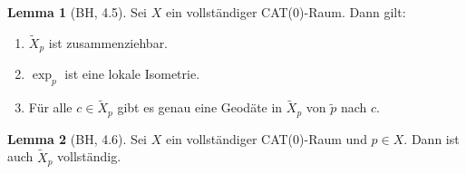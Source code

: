 \documentclass{beamer}
\theoremstyle{definition}
\newtheorem*{lem}{Lemma}
\begin{document}
\begin{frame}
  \begin{lem}[BH, 4.5]
    Sei $X$ ein vollständiger CAT($0$)-Raum. Dann gilt:
    \begin{enumerate}
      \item $\tilde{X}_p$ ist zusammenziehbar.
      \item $\exp_p$ ist eine lokale Isometrie. %
      \item Für alle $c {\in} \tilde{X}_p$ gibt es genau eine Geodäte in $\tilde{X}_p$ von $\tilde{p}$ nach $c$.
    \end{enumerate}
  \end{lem}
\end{frame}

\begin{frame}
  \begin{lem}[BH, 4.6]
    Sei $X$ ein vollständiger CAT($0$)-Raum und $p \in X$. Dann ist auch $\tilde{X}_p$ vollständig.
  \end{lem}
\end{frame}

\end{document}
